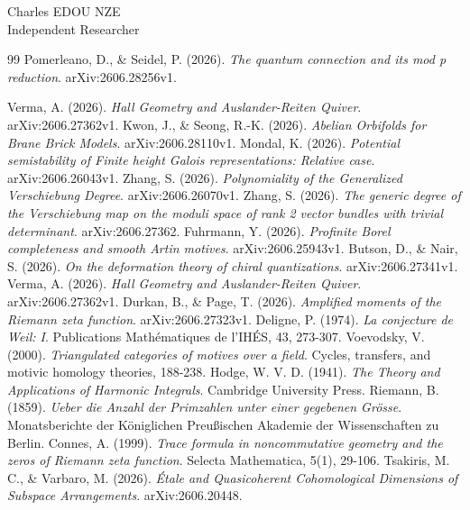 \documentclass[
]{article}
\begin{document}
\vspace{1em}
\begin{flushright}
Charles EDOU NZE \\ \small Independent Researcher
\end{flushright}


\begin{thebibliography}{99}
 Pomerleano, D., \& Seidel, P. (2026). \textit{The quantum connection and its mod p reduction}. arXiv:2606.28256v1.

 Verma, A. (2026). \textit{Hall Geometry and Auslander-Reiten Quiver}. arXiv:2606.27362v1.
 Kwon, J., \& Seong, R.-K. (2026). \textit{Abelian Orbifolds for Brane Brick Models}. arXiv:2606.28110v1.
 Mondal, K. (2026). \textit{Potential semistability of Finite height Galois representations: Relative case}. arXiv:2606.26043v1.
 Zhang, S. (2026). \textit{Polynomiality of the Generalized Verschiebung Degree}. arXiv:2606.26070v1.
 Zhang, S. (2026). \textit{The generic degree of the Verschiebung map on the moduli space of rank 2 vector bundles with trivial determinant}. arXiv:2606.27362.
 Fuhrmann, Y. (2026). \textit{Profinite Borel completeness and smooth Artin motives}. arXiv:2606.25943v1.
 Butson, D., \& Nair, S. (2026). \textit{On the deformation theory of chiral quantizations}. arXiv:2606.27341v1.
 Verma, A. (2026). \textit{Hall Geometry and Auslander-Reiten Quiver}. arXiv:2606.27362v1.
 Durkan, B., \& Page, T. (2026). \textit{Amplified moments of the Riemann zeta function}. arXiv:2606.27323v1.
 Deligne, P. (1974). \textit{La conjecture de Weil: I}. Publications Mathématiques de l'IHÉS, 43, 273-307.
 Voevodsky, V. (2000). \textit{Triangulated categories of motives over a field}. Cycles, transfers, and motivic homology theories, 188-238.
 Hodge, W. V. D. (1941). \textit{The Theory and Applications of Harmonic Integrals}. Cambridge University Press.
 Riemann, B. (1859). \textit{Ueber die Anzahl der Primzahlen unter einer gegebenen Grösse}. Monatsberichte der Königlichen Preußischen Akademie der Wissenschaften zu Berlin.
 Connes, A. (1999). \textit{Trace formula in noncommutative geometry and the zeros of Riemann zeta function}. Selecta Mathematica, 5(1), 29-106.
 Tsakiris, M. C., \& Varbaro, M. (2026). \textit{Étale and Quasicoherent Cohomological Dimensions of Subspace Arrangements}. arXiv:2606.20448.

\end{thebibliography}
\end{document}
